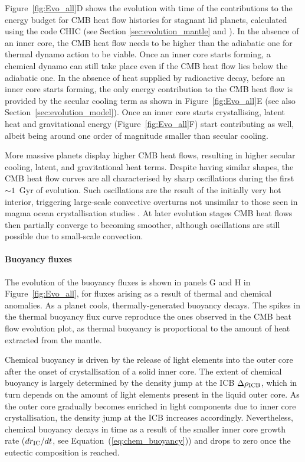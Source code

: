 \documentclass[draft]{agujournal2019} %
\begin{document}
Figure~\ref{fig:Evo_all}D shows the evolution with time of the contributions to the energy budget for CMB heat flow histories for stagnant lid planets, calculated using the code CHIC (see Section \ref{sec:evolution_mantle} and ). In the absence of an inner core, the CMB heat flow needs to be higher than the adiabatic one for thermal dynamo action to be viable. Once an inner core starts forming, a chemical dynamo can still take place even if the CMB heat flow lies below the adiabatic one. In the absence of heat supplied by radioactive decay, before an inner core starts forming, the only energy contribution to the CMB heat flow is provided by the secular cooling term as shown in Figure~\ref{fig:Evo_all}E (see also Section~\ref{sec:evolution_model}). Once an inner core starts crystallising, latent heat and gravitational energy (Figure~\ref{fig:Evo_all}F) start contributing as well, albeit being around one order of magnitude smaller than secular cooling.  

More massive planets display higher CMB heat flows, resulting in higher secular cooling, latent, and gravitational heat terms. Despite having similar shapes, the CMB heat flow curves are all characterised by sharp oscillations during the first $\sim 1$~Gyr of evolution. Such oscillations are the result of the initially very hot interior, triggering large-scale convective overturns not unsimilar to those seen in magma ocean crystallisation studies \cite{ballmer2017reconciling,maurice2017onset}. At later evolution stages CMB heat flows then partially converge to becoming smoother, although oscillations are still possible due to small-scale convection. 

\paragraph*{Buoyancy fluxes}

The evolution of the buoyancy fluxes is shown in panels G and H in Figure~\ref{fig:Evo_all}, for fluxes arising as a result of thermal and chemical anomalies. As a planet cools, thermally-generated buoyancy decays. The spikes in the thermal buoyancy flux curve reproduce the ones observed in the CMB heat flow evolution plot, as thermal buoyancy is proportional to the amount of heat extracted from the mantle. 

Chemical buoyancy is driven by the release of light elements into the outer core after the onset of crystallisation of a solid inner core. The extent of chemical buoyancy is largely determined by the density jump at the ICB $\Delta \rho_{\rm ICB}$, which in turn depends on the amount of light elements present in the liquid outer core. As the outer core gradually becomes enriched in light components due to inner core crystallisation, the density jump at the ICB increases accordingly. Nevertheless, chemical buoyancy decays in time as a result of the smaller inner core growth rate ($dr_{\rm IC}/dt$, see Equation~(\ref{eq:chem_buoyancy})) and drops to zero once the eutectic composition is reached.
\end{document}
